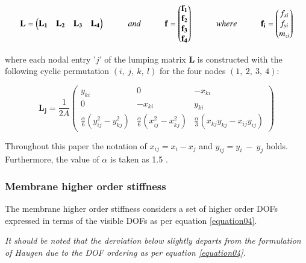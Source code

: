 \begin{equation} 
\mathbf{L} =
\begin{pmatrix}
\mathbf{L_1} & \mathbf{L_2} & \mathbf{L_3} & \mathbf{L_4}
\end{pmatrix}
\hspace{10mm}
and
\hspace{10mm}
\mathbf{f} =
\begin{pmatrix}
\mathbf{f_1} \\
\mathbf{f_2} \\
\mathbf{f_3} \\
\mathbf{f_4}
\end{pmatrix}
\hspace{10mm}
where
\hspace{10mm}
\mathbf{f_i} =
\begin{pmatrix}
{f_{xi}} \\
{f_{yi}} \\
{m_{zi}}
\end{pmatrix}
\label{equation06}
\end{equation}

where each nodal entry '$j$' of the lumping matrix $\textbf{L}$ is constructed with the following cyclic permutation $(i,\ j,\ k,\ l)$ for the four nodes $(1,\ 2,\ 3,\ 4)$:

\begin{equation} 
\mathbf{L_j} = \frac{1}{2 A}
\begin{pmatrix}
y_{ki} & 0 & -x_{ki} \\
0 & -x_{ki} & y_{ki} \\
\frac{\alpha}{6}(y_{ij}^2 - y_{kj}^2 ) & \frac{\alpha}{6}(x_{ij}^2 - x_{kj}^2 ) & \frac{\alpha}{3}(x_{kj}y_{kj} - x_{ij}y_{ij})
\end{pmatrix}
\label{equation07}
\end{equation}

Throughout this paper the notation of $x_{ij} = x_i - x_j$ and $y_{ij} = y_i\ -\ y_j$ holds. Furthermore, the value of $\alpha$ is taken as 1.5 \cite{Fel91}.

\subsubsection{Membrane higher order stiffness}

The membrane higher order stiffness considers a set of higher order DOFs expressed in terms of the visible DOFs as per equation \eqref{equation04}.

\textit{It should be noted that the derviation below slightly departs from the formulation of Haugen \cite{Hau94} due to the DOF ordering as per equation \eqref{equation04}.}

